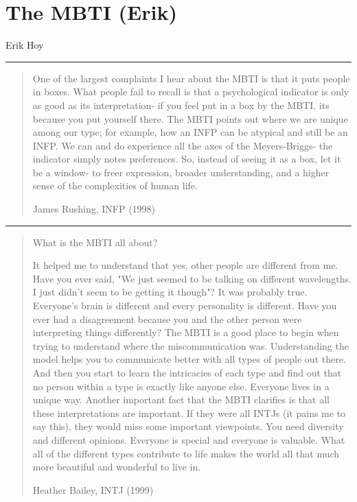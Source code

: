 \chapter{The MBTI (Erik)}

\begin{authors}
	Erik Hoy
\end{authors}

\noindent\rule{\linewidth}{1pt}

\begin{quotation}
One of the largest complaints I hear about the MBTI is that it puts people in boxes. What people fail to recall is that a psychological indicator is only as good as its interpretation- if you feel put in a box by the MBTI, its because you put yourself there. The MBTI points out where we are unique among our type; for example, how an INFP can be atypical and still be an INFP. We can and do experience all the axes of the Meyers-Briggs- the indicator simply notes preferences. So, instead of seeing it as a box, let it be a window- to freer expression, broader understanding, and a higher sense of the complexities of human life.
\begin{flushright}
	James Rushing, INFP (1998)
\end{flushright}
\end{quotation}

\noindent\rule{\linewidth}{1pt}

\begin{quotation}
\begin{center}
	What is the MBTI all about?
\end{center}
It helped me to understand that yes, other people are different from me. Have you ever said, "We just seemed to be talking on different wavelengths. I just didn't seem to be getting it though"? It was probably true. Everyone's brain is different and every personality is different. Have you ever had a disagreement because you and the other person were interpreting things differently? The MBTI is a good place to begin when trying to understand where the miscommunication was. Understanding the model helps you to communicate better with all types of people out there. And then you start to learn the intricacies of each type and find out that no person within a type is exactly like anyone else. Everyone lives in a unique way. Another important fact that the MBTI clarifies is that all these interpretations are important. If they were all INTJs (it pains me to say this), they would miss some important viewpoints. You need diversity and different opinions. Everyone is special and everyone is valuable. What all of the different types contribute to life makes the world all that much more beautiful and wonderful to live in.
\begin{flushright}
	Heather Bailey, INTJ (1999)
\end{flushright}
\end{quotation}

